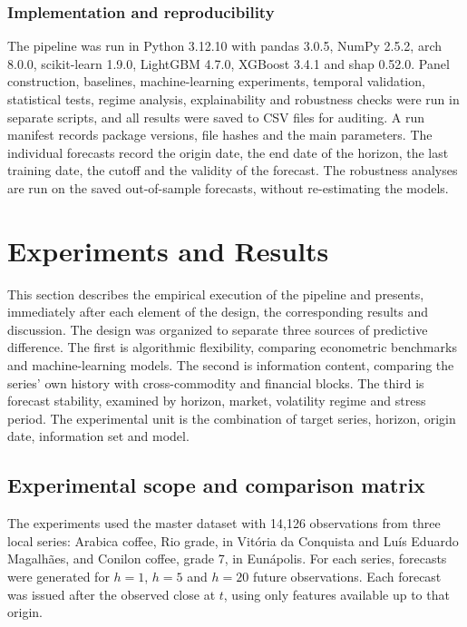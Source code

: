 \documentclass[a4paper,fleqn]{cas-sc}
\begin{document}
\subsubsection{Implementation and reproducibility}
\label{subsec:reproducibility}

The pipeline was run in Python 3.12.10 with pandas 3.0.5, NumPy 2.5.2, arch 8.0.0, scikit-learn 1.9.0, LightGBM 4.7.0, XGBoost 3.4.1 and shap 0.52.0. Panel construction, baselines, machine-learning experiments, temporal validation, statistical tests, regime analysis, explainability and robustness checks were run in separate scripts, and all results were saved to CSV files for auditing. A run manifest records package versions, file hashes and the main parameters. The individual forecasts record the origin date, the end date of the horizon, the last training date, the cutoff and the validity of the forecast. The robustness analyses are run on the saved out-of-sample forecasts, without re-estimating the models.

\section{Experiments and Results}
\label{sec:experiments}

This section describes the empirical execution of the pipeline and presents, immediately after each element of the design, the corresponding results and discussion. The design was organized to separate three sources of predictive difference. The first is algorithmic flexibility, comparing econometric benchmarks and machine-learning models. The second is information content, comparing the series' own history with cross-commodity and financial blocks. The third is forecast stability, examined by horizon, market, volatility regime and stress period. The experimental unit is the combination of target series, horizon, origin date, information set and model.

\subsection{Experimental scope and comparison matrix}
\label{subsec:experimental_scope}

The experiments used the master dataset with 14,126 observations from three local series: Arabica coffee, Rio grade, in Vitória da Conquista and Luís Eduardo Magalhães, and Conilon coffee, grade 7, in Eunápolis. For each series, forecasts were generated for \(h=1\), \(h=5\) and \(h=20\) future observations. Each forecast was issued after the observed close at \(t\), using only features available up to that origin.
\end{document}
